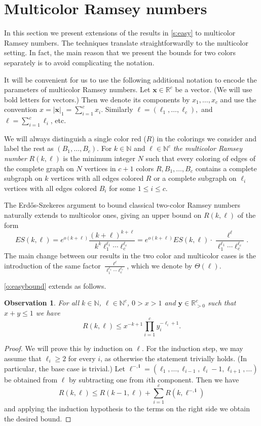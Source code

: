 \documentclass[reqno,final,12pt]{amsart}
\newtheorem{obs}[thm]{Observation}
\newcommand{\bb}[1]{\mathbb{#1}}
\newcommand{\bl}[1]{\boldsymbol{#1}}
\newcommand{\abs}[1]{| #1 |_1}
\begin{document}

\section{Multicolor Ramsey numbers}\label{s:multi}

In this section we  present extensions of the results in \cref{s:easy}  to multicolor Ramsey numbers. The techniques translate straightforwardly to the multicolor setting. In fact, the main reason that we present the bounds for two colors separately is to avoid complicating the notation.   

It will be convenient for us to use the following additional notation to encode the parameters of multicolor Ramsey numbers. Let $\bl{x} \in \bb{R}^c$ be a vector. (We will use bold letters for vectors.) Then we denote its components by $x_1,\ldots,x_c$ and use the convention $x = \abs{\bl{x}}=\sum_{i=1}^cx_i$. Similarly $\bl{\ell}=(\ell_1,\ldots,\ell_c),$ and $\ell = \sum_{i=1}^c\ell_i$, etc. 

We will always distinguish a single color red ($R$) in the colorings we consider and  label the rest as $(B_1,\dots,B_c)$. For $k \in \bb{N}$ and  $\bl{\ell}\in \bb{N}^c$
\emph{the multicolor Ramsey number} $R(k,\bl{\ell})$ is the minimum integer $N$ such that every coloring of edges of the complete graph on $N$ vertices in $c+1$ colors $R,B_1,\dots,B_c$ contains a complete subgraph on $k$ vertices with all edges colored $R$ or a complete subgraph on $\ell_i$ vertices with all edges colored $B_i$ for some $1 \leq i \leq c$.

The Erd\H{o}s-Szekeres argument to bound classical two-color Ramsey numbers naturally extends to multicolor ones, giving an upper bound on $R(k,\bl{\ell})$ of the form $$ES(k,\bl{\ell}) = e^{o(k+\ell)}\frac{(k+\ell)^{k+\ell}}{k^k \ell_1^{\ell_1}\cdots\ell_c^{\ell_c}} =  e^{o(k+\ell)} ES(k,\ell)\cdot \frac{\ell^{\ell}}{\ell_1^{\ell_1}\cdots\ell_c^{\ell_c}}.$$
The main change between our results in the two color and multicolor cases is the introduction of the same factor  $\frac{\ell^{\ell}}{\ell_1^{\ell_1}\cdots\ell_c^{\ell_c}}$, which we denote by $\Theta(\bl{\ell})$.

\cref{o:easybound} extends as follows.

\begin{obs}\label{o:easybound2} For all  $k \in \bb{N}$, $\bl{\ell}\in \bb{N}^c$, $0>x>1$ and $\bl{y}\in \bb{R}_{>0}^c$ such that $x+y \leq 1$  we have
	$$R(k,\bl{\ell}) \leq x^{-k+1}\prod_{i=1}^{c}y_i^{-\ell_i+1}.$$	
\end{obs}
\begin{proof}
	We will prove this by induction on $\ell$.
	For the induction step, we may assume that $\ell_i \geq 2$ for every $i$, as otherwise the statement trivially holds. (In particular, the base case is trivial.) Let $\bl{\ell^{-,i}}=(\ell_1,\ldots,\ell_{i-1},\ell_{i}-1,\ell_{i+1},\ldots)$ be obtained from $\bl{\ell}$ by subtracting one from $i$th component. Then we have $$ R(k,\bl{\ell})\leq R(k-1,\bl{\ell}) + \sum_{i=1}^{c}R(k,\bl{\ell^{-,i}})$$
and	applying the induction hypothesis to the terms on the right side we obtain the desired bound. 
\end{proof}
\end{document}
